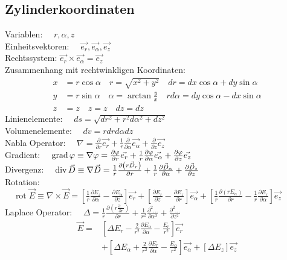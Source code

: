 \subsection{Zylinderkoordinaten}
Variablen:          $\quad r, \alpha, z$\\
Einheitsvektoren:   $\quad \vec{e_{r}}, \vec{e_{\alpha}}, \vec{e_{z}} \quad$\\
Rechtssystem: $\vec{e_{r}} \times \vec{e_{\alpha}}=\vec{e_{z}}$\\
Zusammenhang mit rechtwinkligen Koordinaten:
\begin{align*}
    x&=r \cos \alpha \quad r=\sqrt{x^{2}+y^{2}} \quad d r=d x \cos \alpha+d y \sin \alpha\\
    y&=r \sin \alpha \quad \alpha=\arctan \frac{y}{x} \quad r d \alpha=d y \cos \alpha-d x \sin \alpha\\
    z&=z \quad z=z \quad d z=d z
\end{align*}
Linienelemente:     $\quad d s=\sqrt{d r^{2}+r^{2} d \alpha^{2}+d z^{2}}$\\
Volumenelemente:    $\quad d v=r d r d \alpha d z$\\
Nabla Operator:     $\quad \nabla=\frac{\partial}{\partial r} \vec{e_{r}}+\frac{1}{r} \frac{\partial}{\partial \alpha} \vec{e_{\alpha}}+\frac{\partial}{\partial z} \vec{e_{z}}$\\
Gradient:           $\quad \operatorname{grad} \varphi \equiv \nabla \varphi=\frac{\partial \varphi}{\partial r} \vec{e_{r}}+\frac{1}{r} \frac{\partial \varphi}{\partial \alpha} \vec{e_{\alpha}}+\frac{\partial \varphi}{\partial z} \vec{e_{z}}$\\
Divergenz:          $\quad \operatorname{div} \vec{D} \equiv \nabla \vec{D}=\frac{1}{r} \frac{\partial\left(r \vec{D}_{r}\right)}{\partial r}+\frac{1}{r} \frac{\partial \vec{D}_{\alpha}}{\partial \alpha}+\frac{\partial \vec{D}_{z}}{\partial z}$\\
Rotation:           $\quad \operatorname{rot} \vec{E} \equiv \nabla \times \vec{E}=\left[\frac{1}{r} \frac{\partial E_{z}}{\partial \alpha}-\frac{\partial E_{\alpha}}{\partial z}\right] \vec{e_{r}}+\left[\frac{\partial E_{r}}{\partial z}-\frac{\partial E_{z}}{\partial r}\right] \vec{e_{\alpha}}+\left[\frac{1}{r} \frac{\partial\left(r E_{\alpha}\right)}{\partial r}-\frac{1}{r} \frac{\partial E_{r}}{\partial \alpha}\right] \vec{e_{z}}$\\
Laplace Operator:   $\quad \Delta = \frac{1}{r}\frac{\partial \left(r \frac{\partial \ldots}{\partial r}\right)}{\partial r} + \frac{1}{r^2}\frac{\partial^2 \ldots}{\partial \alpha^2} + \frac{\partial^2 \ldots}{\partial z^2}$\\
\begin{align*}
    \vec{E} =& \left[\Delta E_{r}-\frac{2}{r^{2}} \frac{\partial E_{\alpha}}{\partial \alpha}-\frac{E_{r}}{r^{2}}\right] \vec{e_{r}}\\
             &+\left[\Delta E_{\alpha}+\frac{2}{r^{2}} \frac{\partial E_{r}}{\partial \alpha}-\frac{E_{\alpha}}{r^{2}}\right] \vec{e_{\alpha}}+\left[\Delta E_{z}\right] \vec{e_{z}}
\end{align*}

